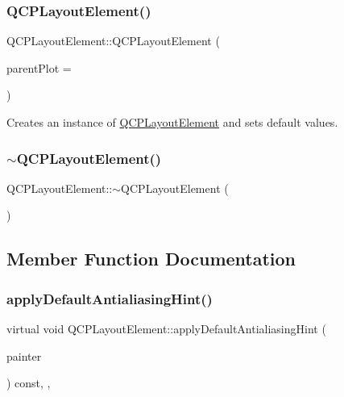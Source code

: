 \subsubsection{\texorpdfstring{QCPLayoutElement()}{QCPLayoutElement()}}
{\footnotesize\ttfamily Q\+C\+P\+Layout\+Element\+::\+Q\+C\+P\+Layout\+Element (\begin{DoxyParamCaption}\item[{\mbox{\hyperlink{class_q_custom_plot}{Q\+Custom\+Plot}} $\ast$}]{parent\+Plot = {} }\end{DoxyParamCaption})\hspace{0.3cm}{\ttfamily [explicit]}}

Creates an instance of \mbox{\hyperlink{class_q_c_p_layout_element}{Q\+C\+P\+Layout\+Element}} and sets default values. \mbox{\label{class_q_c_p_layout_element_a0dc52343920011b3e72d61fc94ed3400}} 
\subsubsection{\texorpdfstring{$\sim$QCPLayoutElement()}{~QCPLayoutElement()}}
{\footnotesize\ttfamily Q\+C\+P\+Layout\+Element\+::$\sim$\+Q\+C\+P\+Layout\+Element (\begin{DoxyParamCaption}{ }\end{DoxyParamCaption})\hspace{0.3cm}{\ttfamily [virtual]}}



\subsection{Member Function Documentation}
\mbox{\label{class_q_c_p_layout_element_a0a8f18141bcf46cf40ad4c13324ff346}} 
\subsubsection{\texorpdfstring{applyDefaultAntialiasingHint()}{applyDefaultAntialiasingHint()}}
{\footnotesize\ttfamily virtual void Q\+C\+P\+Layout\+Element\+::apply\+Default\+Antialiasing\+Hint (\begin{DoxyParamCaption}\item[{\mbox{\hyperlink{class_q_c_p_painter}{Q\+C\+P\+Painter}} $\ast$}]{painter }\end{DoxyParamCaption}) const\hspace{0.3cm}{\ttfamily [inline]}, {\ttfamily [protected]}, {\ttfamily [virtual]}}



